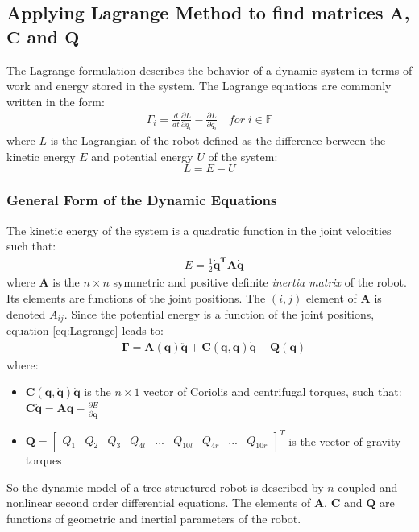 \documentclass[a4paper,10pt]{article}
\begin{document}
\subsection{Applying Lagrange Method to find matrices $\mathbf{A}$, $\mathbf{C}$ and $\mathbf{Q}$}
The Lagrange formulation describes the behavior of a dynamic system in terms of work and energy stored in the
system. The Lagrange equations are commonly written in the form:
\begin{align}
  \Gamma_i = \frac{d}{dt}\frac{\partial L}{\partial \dot{q}_i}-\frac{\partial L}{\partial q_i} \quad for\; i \in \mathbb{F} \label{eq:Lagrange}
\end{align} where $L$ is the Lagrangian of the robot defined as the difference berween the kinetic energy $E$ and potential 
energy $U$ of the system:
\[
 L = E-U
\]
\subsubsection{General Form of the Dynamic Equations}
The kinetic energy of the system is a quadratic function in the joint velocities such that:
\begin{align}
 &E = \frac{1}{2}\mathbf{\dot{q}^TA\dot{q}}
\end{align} where $\mathbf{A}$ is the $n\times n$ symmetric and positive definite \textit{inertia matrix} of the robot.
Its elements are functions of the joint positions. The $(i,j)$ element of $\mathbf{A}$ is denoted $A_{ij}$. Since the 
potential energy is a function of the joint positions, equation \ref{eq:Lagrange} leads to:
\begin{align}
 &\mathbf{\Gamma=A(q)\ddot{q}+C(q,\dot{q})\dot{q}+Q(q)}
\end{align} where:
\begin{itemize}
 \item $\mathbf{C(q,\dot{q})\dot{q}}$ is the $n\times 1$ vector of Coriolis and centrifugal torques, such that: 
 $\mathbf{C\dot{q} = \dot{A}\dot{q}}-\frac{\partial E}{\partial \mathbf{q}}$
 \item $\mathbf{Q} = \left[\begin{matrix} Q_1 & Q_2 & Q_3 & Q_{4l} & ... & Q_{10l} & Q_{4r} & ... & Q_{10r} \end{matrix} \right]^T$ 
 is the vector of gravity torques
\end{itemize}
So the dynamic model of a tree-structured robot is described by $n$ coupled and nonlinear second order differential
equations. The elements of $\mathbf{A}$, $\mathbf{C}$ and $\mathbf{Q}$ are functions of geometric and inertial 
parameters of the robot.
\end{document}

